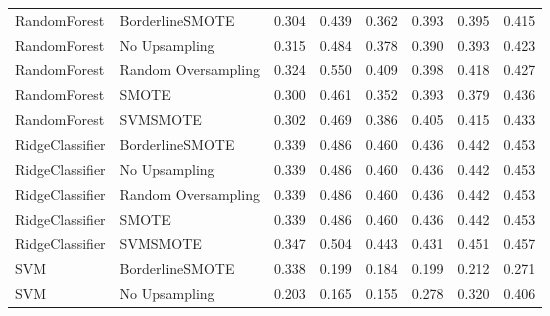 \begin{tabular}{llllllll}
                RandomForest &     BorderlineSMOTE & 0.304 &                     0.439 &                 0.362 &                  0.393 &                                   0.395 &     0.415 \\
                RandomForest &       No Upsampling & 0.315 &                     0.484 &                 0.378 &                  0.390 &                                   0.393 &     0.423 \\
                RandomForest & Random Oversampling & 0.324 &                     0.550 &                 0.409 &                  0.398 &                                   0.418 &     0.427 \\
                RandomForest &               SMOTE & 0.300 &                     0.461 &                 0.352 &                  0.393 &                                   0.379 &     0.436 \\
                RandomForest &            SVMSMOTE & 0.302 &                     0.469 &                 0.386 &                  0.405 &                                   0.415 &     0.433 \\
             RidgeClassifier &     BorderlineSMOTE & 0.339 &                     0.486 &                 0.460 &                  0.436 &                                   0.442 &     0.453 \\
             RidgeClassifier &       No Upsampling & 0.339 &                     0.486 &                 0.460 &                  0.436 &                                   0.442 &     0.453 \\
             RidgeClassifier & Random Oversampling & 0.339 &                     0.486 &                 0.460 &                  0.436 &                                   0.442 &     0.453 \\
             RidgeClassifier &               SMOTE & 0.339 &                     0.486 &                 0.460 &                  0.436 &                                   0.442 &     0.453 \\
             RidgeClassifier &            SVMSMOTE & 0.347 &                     0.504 &                 0.443 &                  0.431 &                                   0.451 &     0.457 \\
                         SVM &     BorderlineSMOTE & 0.338 &                     0.199 &                 0.184 &                  0.199 &                                   0.212 &     0.271 \\
                         SVM &       No Upsampling & 0.203 &                     0.165 &                 0.155 &                  0.278 &                                   0.320 &     0.406 \\

\end{tabular}
